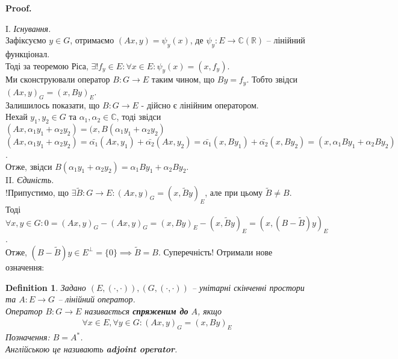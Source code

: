 \documentclass[a4paper, 10pt]{article}
\makeatletter
\theoremstyle{theoremdd}
\newtheorem{definition}[theorem]{Definition}
\renewenvironment{proof}[1][Proof.\\]{\par
\pushQED{\hfill \qed}%
\normalfont \topsep6\p@\@plus6\p@\relax
\trivlist
\item\relax
{\bfseries
#1\@addpunct{.}}\hspace\labelsep\ignorespaces
}{%
\popQED\endtrivlist\@endpefalse
}
\makeatother
\begin{document}
\begin{proof}
I. \textit{Існування.}\\
Зафіксуємо $y \in G$, отримаємо $(Ax,y) = \psi_y(x)$, де $\psi_y \colon E \to \mathbb{C} (\mathbb{R})$ -- лінійний функціонал.\\
Тоді за теоремою Ріса, $\exists! f_y \in E: \forall x \in E: \psi_y(x) = (x,f_y)$.\\
Ми сконструювали оператор $B \colon G \to E$ таким чином, що $By = f_y$. Тобто звідси $(Ax,y)_G = (x,By)_E$.\\
Залишилось показати, що $B \colon G \to E$ - дійсно є лінійним оператором.\\
Нехай $y_1,y_2 \in G$ та $\alpha_1,\alpha_2 \in \mathbb{C}$, тоді звідси\\
$(Ax,\alpha_1 y_1 + \alpha_2 y_2) = (x,B(\alpha_1 y_1 + \alpha_2 y_2)$\\
$(Ax,\alpha_1 y_1 + \alpha_2 y_2) = \bar{\alpha_1} (Ax,y_1) + \bar{\alpha_2} (Ax,y_2) = \bar{\alpha_1} (x,By_1) + \bar{\alpha_2} (x,By_2) = (x,\alpha_1 By_1 + \alpha_2 By_2)$.\\
Отже, звідси $B(\alpha_1 y_1 + \alpha_2 y_2) = \alpha_1 By_1 + \alpha_2 By_2$.
\bigskip \\
II. \textit{Єдиність.}\\
!Припустимо, що $\exists \widetilde{B} \colon G \to E: (Ax,y)_G = (x,\widetilde{B}y)_E$, але при цьому $\widetilde{B} \neq B$. Тоді\\
$\forall x,y \in G: 0 = (Ax,y)_G - (Ax,y)_G = (x,By)_E - (x,\widetilde{B}y)_E = (x,(B-\widetilde{B})y)_E$.\\
Отже, $(B-\widetilde{B})y \in E^\perp = \{0\} \implies \widetilde{B} = B$. Суперечність!
\end{proof}
\noindent Отримали нове означення:

\begin{definition}
Задано $(E,(\cdot,\cdot)), (G,(\cdot,\cdot))$ -- унітарні скінченні простори та $A \colon E \to G$ -- лінійний оператор.\\
Оператор $B \colon G \to E$ називається \textbf{спряженим до} $A$, якщо
\begin{align*}
\forall x \in E, \forall y \in G: (Ax,y)_G = (x,By)_E
\end{align*}
Позначення: $B = A^*$.\\
Англійською це називають \textbf{adjoint operator}.
\end{definition}
\end{document}
